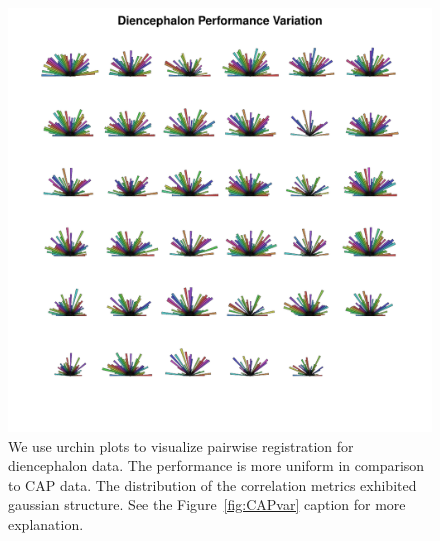 \documentclass{llncs}
\begin{document}
\begin{figure}[t]
 \centering 
  \includegraphics[width=3.in]{../figs/diencephalon_perf.pdf}
 \caption{We use urchin plots to visualize pairwise registration for
   diencephalon data.  The performance is more uniform in comparison
   to CAP data.  The distribution of the correlation metrics exhibited
 gaussian structure.   See the Figure~\ref{fig:CAPvar} caption for more explanation.}
 \label{fig:DIEvar}
\end{figure}
\end{document}
